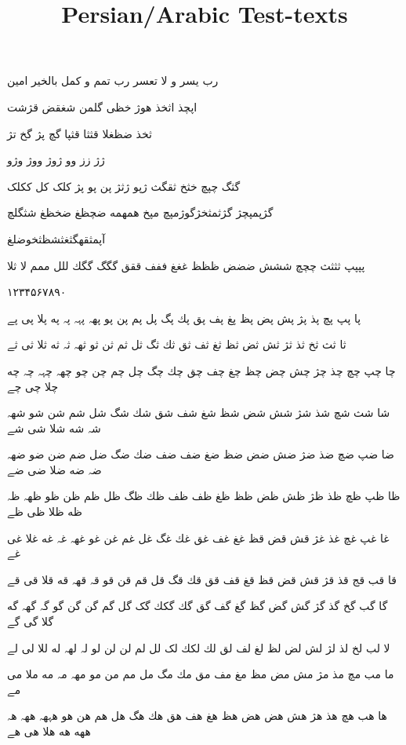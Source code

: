 \documentclass[a4paper]{article}
\title{Persian/Arabic Test-texts}
\begin{document}
\begin{flushright}
\pagecolor{pagecolor}
\color{textcolor}

\newpage

\huge

رب یسر و لا تعسر رب تمم و کمل بالخیر امین

اپچذ اثخذ هوژ خظی گلمن شغقض قژشت

ثخذ ضظغلا قثثا قثپا گچ پژ گخ تژ

 ژژ زز وو ژوژ ووژ وژو

گثگ چپچ خثخ ثقگث ژپو ژثژ پن پو پژ کلک کل ککلک

گژپمپچژ گژثمثخژگوژمپچ مپخ همهمه ضچظغ ضخظغ شثگلچ

آپمثقهگثغثشظثخوضلغ

پپپپ ثثثث چچچ ششش ضضض ظظظ غغغ ففف ققق گگگ گگك للل ممم لا ثلا

۱۲۳۴۵۶۷۸۹۰

پا پپ پچ پذ پژ پش پض پظ پغ پف پق پك پگ پل پم پن پو پهہ پہہ پہ په پلا پی پے

ثا ثث ثخ ثذ ثژ ثش ثض ثظ ثغ ثف ثق ثك ثگ ثل ثم ثن ثو ثهہ ثہ ثه ثلا ثی ثے

چا چپ چچ چذ چژ چش چض چظ چغ چف چق چك چگ چل چم چن چو چهہ چہہ چہ چه چلا چی چے

شا شث شچ شذ شژ شش شض شظ شغ شف شق شك شگ شل شم شن شو شهہ شہ شه شلا شی شے

ضا ضپ ضچ ضذ ضژ ضش ضض ضظ ضغ ضف ضف ضك ضگ ضل ضم ضن ضو ضهہ ضہ ضه ضلا ضی ضے

ظا ظپ ظچ ظذ ظژ ظش ظض ظظ ظغ ظف ظف ظك ظگ ظل ظم ظن ظو ظهہ ظہ ظه ظلا ظی ظے

غا غپ غچ غذ غژ قش قض قظ غغ غف غق غك غگ غل غم غن غو غهہ غہ غه غلا غی غے

قا قب قج قذ قژ قش قض قظ قغ قف قق قك قگ قل قم قن قو قہ قهہ قه قلا قی قے

گا گب گخ گذ گژ گش گض گظ گغ گف گق گك گکك گک گل گم گن گن گو گہ گهہ گه گلا گی گے

لا لب لخ لذ لژ لش لض لظ لغ لف لق لك لکك لک لل لم لن لن لو لہ لهہ له للا لی لے

ما مب مچ مذ مژ مش مض مظ مغ مف مق مك مگ مل مم من مو مهہ مہ مه ملا می مے

ها هب هچ هذ هژ هش هض هض هظ هغ هف هق هك هگ هل هم هن هو هہهہ ههہ هہ ههه هه هلا هی هے


\end{flushright}
\end{document}
